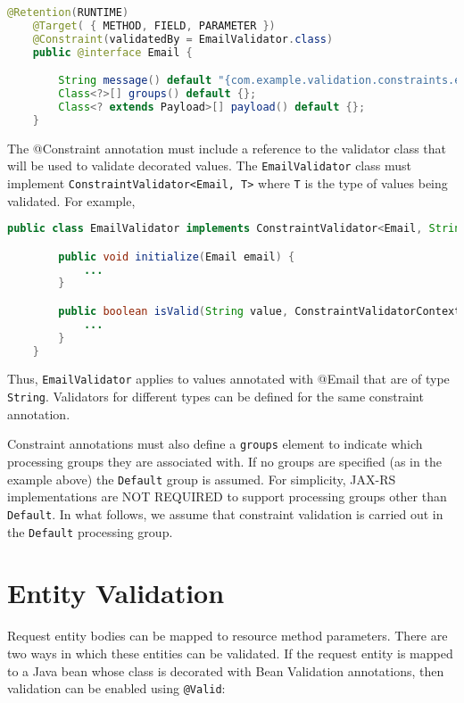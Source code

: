 \begin{lstlisting}[language=Java]
    @Retention(RUNTIME)
    @Target( { METHOD, FIELD, PARAMETER })
    @Constraint(validatedBy = EmailValidator.class)
    public @interface Email {

        String message() default "{com.example.validation.constraints.email}";
        Class<?>[] groups() default {};
        Class<? extends Payload>[] payload() default {};
    }
\end{lstlisting}

The @Constraint annotation must include a reference to the validator class that will be used to validate
decorated values. The \lstinline{EmailValidator} class must implement \lstinline{ConstraintValidator<Email, T>} where
\lstinline{T} is the type of values being validated. For example,

\begin{lstlisting}[language=Java]
    public class EmailValidator implements ConstraintValidator<Email, String> {

        public void initialize(Email email) {
            ...
        }

        public boolean isValid(String value, ConstraintValidatorContext context) {
            ...
        }
    }
\end{lstlisting}

Thus, \lstinline{EmailValidator} applies to values annotated with @Email that are of type
\lstinline{String}. Validators for different types can be defined for the same constraint annotation.

Constraint annotations must also define a \lstinline{groups} element to indicate which processing groups they are
associated with. If no groups are specified (as in the example above) the \lstinline{Default} group is assumed. For
simplicity, JAX-RS implementations are NOT REQUIRED to support processing groups other than \lstinline{Default}. In what
follows, we assume that constraint validation is carried out in the \lstinline{Default} processing group.

\section{Entity Validation}
\label{entity_validation}

Request entity bodies can be mapped to resource method parameters. There are two ways in which these entities can be
validated. If the request entity is mapped to a Java bean whose class is decorated with Bean Validation annotations,
then validation can be enabled using \lstinline{@Valid}:

